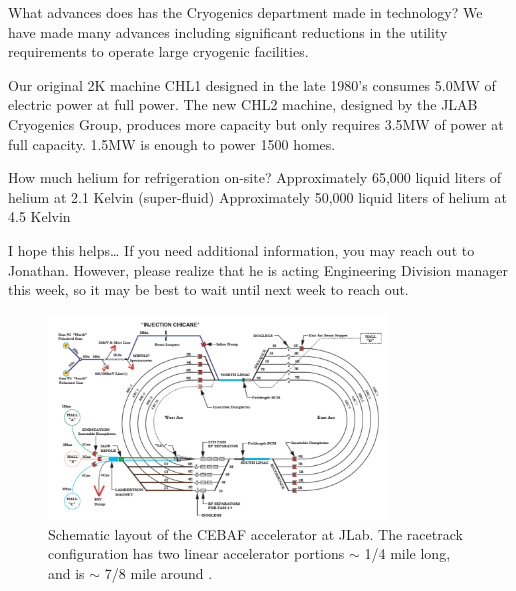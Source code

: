     What advances does has the Cryogenics department made in technology? We have made many advances including significant reductions in the utility requirements to operate large cryogenic facilities. 
    
    Our original 2K machine CHL1 designed in the late 1980’s consumes 5.0MW of electric power at full power. The new CHL2 machine, designed by the JLAB Cryogenics Group, produces more capacity but only requires 3.5MW of power at full capacity. 1.5MW is enough to power 1500 homes.
        
    How much helium for refrigeration on-site?
    Approximately 65,000 liquid liters of helium at 2.1 Kelvin (super-fluid)
    Approximately 50,000 liquid liters of helium at 4.5 Kelvin
    
    I hope this helps… If you need additional information, you may reach out to Jonathan. However, please realize that he is acting Engineering Division manager this week, so it may be best to wait until next week to reach out.
    \fi
    
    \begin{figure}[ht]
        \centering
        \includegraphics[width=0.8\textwidth]{Chapters/Ch2-Experiment/accel_and_beamline/pics/CEBAF/jlab-accelerator-layout.png}
        \caption[JLab Accelerator Schematic]{Schematic layout of the CEBAF accelerator at JLab. The racetrack configuration has two linear accelerator portions $\sim$ 1/4 mile long, and is $\sim$ 7/8 mile around \parencite{Wang2010CEBAFOverview}.}
        \label{fig:jlab_accelerator_layout}
    \end{figure}
    
